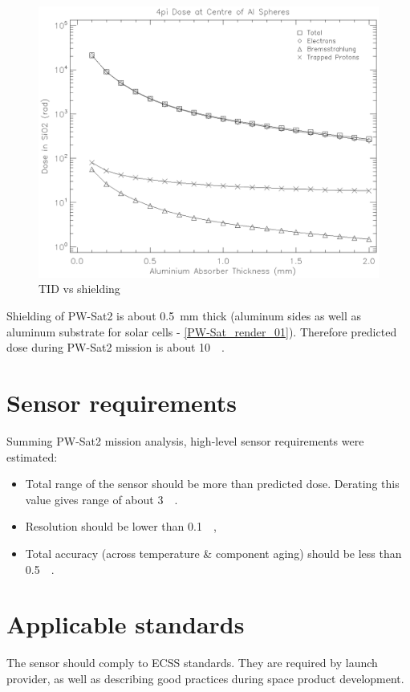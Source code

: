     \begin{figure}[H]
        \centering
        \includegraphics[width=0.7\paperwidth]{img/dose.eps}
        \caption{TID vs shielding}
        \label{TIDvsSheilding}
    \end{figure}

    Shielding of PW-Sat2 is about \SI{0.5}{\milli\meter} thick (aluminum sides as well as aluminum substrate for solar cells - \ref{PW-Sat_render_01}). Therefore predicted dose during PW-Sat2 mission is about \SI{10}{\kilo\rad}.


\section{Sensor requirements}
    Summing PW-Sat2 mission analysis, high-level sensor requirements were estimated:

    \begin{itemize}
        \item Total range of the sensor should be more than predicted dose. Derating this value gives range of about \SI{3}{\kilo\rad}.

        \item Resolution should be lower than \SI{0.1}{\kilo\rad}, 

        \item Total accuracy (across temperature \& component aging) should be less than \SI{0.5}{\kilo\rad}.
    \end{itemize}




\section{Applicable standards}
    The sensor should comply to ECSS \cite{ECSS_URL} standards. They are required by launch provider, as well as describing good practices during space product development.

